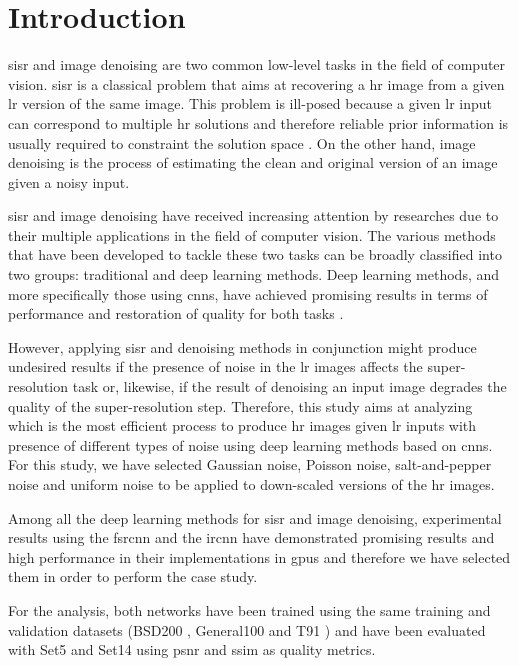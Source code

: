 \section{Introduction}

\Gls{sisr} and image denoising are two common low-level tasks in the field of computer vision. \Gls{sisr} is a classical problem that aims at recovering a \gls{hr} image from a given \gls{lr} version of the same image. This problem is ill-posed because a given \gls{lr} input can correspond to multiple \gls{hr} solutions and therefore reliable prior information is usually required to constraint the solution space \cite{DBLP:SISR} \cite{SRCNN} \cite{DBLP:DEEPSISR}. On the other hand, image denoising is the process of estimating the clean and original version of an image given a noisy input.

\gls{sisr} and image denoising have received increasing attention by researches due to their multiple applications in the field of computer vision. The various methods that have been developed to tackle these two tasks can be broadly classified into two groups: traditional and deep learning methods. Deep learning methods, and more specifically those using \glspl{cnn}, have achieved promising results in terms of performance and restoration of quality for both tasks \cite{DBLP:DEEPNR} \cite{DBLP:DEEPSISR}.

However, applying \gls{sisr} and denoising methods in conjunction might produce undesired results if the presence of noise in the \gls{lr} images affects the super-resolution task or, likewise, if the result of denoising an input image degrades the quality of the super-resolution step. Therefore, this study aims at analyzing which is the most efficient process to produce \gls{hr} images given \gls{lr} inputs with presence of different types of noise using deep learning methods based on \glspl{cnn}. For this study, we have selected Gaussian noise, Poisson noise, salt-and-pepper noise and uniform noise to be applied to down-scaled versions of the \gls{hr} images.

Among all the deep learning methods for \gls{sisr} and image denoising, experimental results using the \gls{fsrcnn} \cite{FSRCNN} and the \gls{ircnn} \cite{IRCNN} have demonstrated promising results and high performance in their implementations in \glspl{gpu} and therefore we have selected them in order to perform the case study.

For the analysis, both networks have been trained using the same training and validation datasets (BSD200 \cite{BSDS}, General100 \cite{FSRCNN} and T91 \cite{T91}) and have been evaluated with Set5 \cite{SET5} and Set14 \cite{SET14} using \gls{psnr} and \gls{ssim} as quality metrics.

